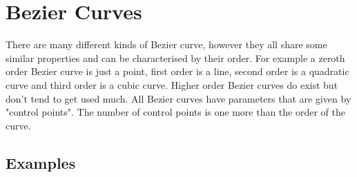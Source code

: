 \documentclass[a5paper,12pt]{book}
\begin{document}

\clearpage
\tableofcontents
\listoftables
\listoffigures
\clearpage

\chapter{Bezier Curves}
There are many different kinds of Bezier curve, however they all share some similar properties and can be characterised by their order.
For example a zeroth order Bezier curve is just a point, first order is a line, second order is a quadratic curve and third order is a cubic curve.
Higher order Bezier curves do exist but don't tend to get used much. All Bezier curves have parameters that are given by "control points". The number of control points is one more than the order of the curve.
\section{Examples}

\clearpage
{}
\printindex
\end{document}
